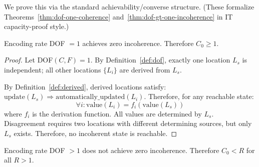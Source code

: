 We prove this via the standard achievability/converse structure. (These formalize Theorems~\ref{thm:dof-one-coherence} and~\ref{thm:dof-gt-one-incoherence} in IT capacity-proof style.)

\begin{theorem}[Achievability]\label{thm:capacity-achievability}
Encoding rate DOF $= 1$ achieves zero incoherence. Therefore $C_0 \geq 1$.
\end{theorem}

\begin{proof}
Let DOF$(C, F) = 1$. By Definition~\ref{def:dof}, exactly one location $L_s$ is independent; all other locations $\{L_i\}$ are derived from $L_s$.

By Definition~\ref{def:derived}, derived locations satisfy: $\text{update}(L_s) \Rightarrow \text{automatically\_updated}(L_i)$. Therefore, for any reachable state:
\[
\forall i: \text{value}(L_i) = f_i(\text{value}(L_s))
\]
where $f_i$ is the derivation function. All values are determined by $L_s$. Disagreement requires two locations with different determining sources, but only $L_s$ exists. Therefore, no incoherent state is reachable.
\end{proof}

\begin{theorem}[Converse]\label{thm:capacity-converse}
Encoding rate DOF $> 1$ does not achieve zero incoherence. Therefore $C_0 < R$ for all $R > 1$.
\end{theorem}

